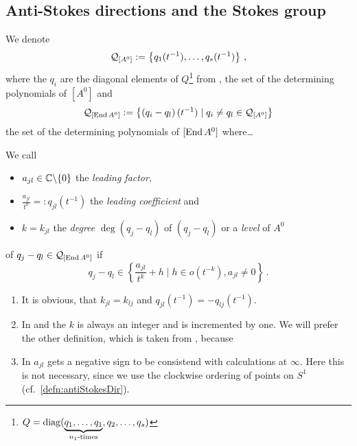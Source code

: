 \subsection{Anti-Stokes directions and the Stokes group}
\begin{comment}
  \cite[I.4]{Loday1994}
\end{comment}
We denote
\[
  \mathcal{Q}_{[A^0]}
  :=
  \left\{q_1(t^{-1}),\dots,q_s(t^{-1})\right\}
  \,,
\]
where the $q_i$ are the diagonal elements of $Q$\footnote{$Q=\operatorname{diag}(
\underset{n_1\text{-times}}{\underbrace{q_1,\dots,q_1}},q_2,\dots ,q_s)$}
from \TODO{},
the set of the determining polynomials of $[A^0]$ and
\[
  \mathcal{Q}_{[\operatorname{End} A^0]}:=\left\{\left(q_i-q_l\right)(t^{-1})
    \mid q_i \neq q_l \in\mathcal{Q}_{[A^0]}
  \right\}
\]
the set of the determining polynomials of $[\operatorname{End} A^0]$ where\dots
\begin{defn}\label{defn:determiningPolysOfEndA}
  We call
  \begin{itemize}
    \item $a_{jl}\in\mathbb{C}\backslash\{0\}$ the \emph{leading factor},
    \item $\frac{a_{jl}}{t^{k}}=:q_{jl}(t^{-1})$ the \emph{leading
      coefficient} and
    \item $k=k_{jl}$ the \emph{degree} $\deg(q_j-q_l)$ of $(q_j-q_l)$ or a
      \emph{level} of $A^0$
  \end{itemize}
  of $q_j-q_l\in\mathcal{Q}_{[\operatorname{End} A^0]}$ if
  \[
    q_j-q_l\in\left\{\frac{a_{jl}}{t^{k}}+h \mid h \in o(t^{-k}), a_{jl}\neq0
    \right\}\,.
  \]
  \begin{s-rem}
    \begin{enumerate}
      \item It is obvious, that $k_{jl}=k_{lj}$ and
        $q_{jl}(t^{-1})=-q_{lj}(t^{-1})$.
      \item In \cite{boalch} and \cite{thboalch} the $k$ is always an integer
        and is incremented by one. We will prefer the other definition, which
        is taken from \cite{Loday1994}, because \TODO
      \item In \cite[Def.4.3.6]{Loday2014} $a_{jl}$ gets a negative sign to
        be consistend with calculations at $\infty$. Here this is not
        necessary, since we use the clockwise ordering of points on $S^1$
        (cf.~\ref{defn:antiStokesDir}).
        \begin{comment}
          Does that mean, that, to be consistend with \cite{boalch}, one has to
          invert the permutation matrix?
        \end{comment}

\end{enumerate}
\end{s-rem}
\end{defn}
